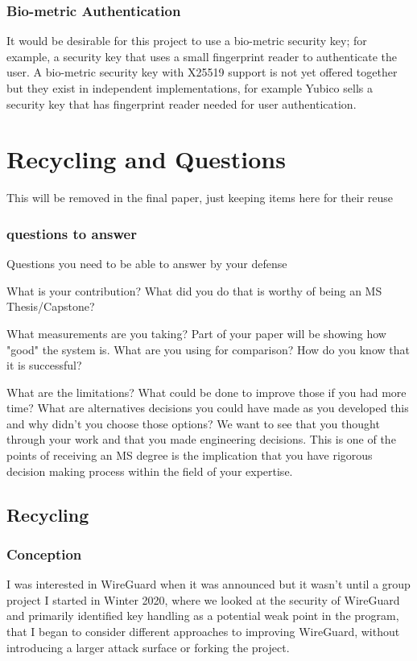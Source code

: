 \documentclass [11pt, proquest] {uwthesis}[2020/02/24]
\begin{document}
\subsection{Bio-metric Authentication}
It would be desirable for this project to use a bio-metric security key; for example, a security key that uses a small fingerprint reader to authenticate the user. A bio-metric security key with X25519 support is not yet offered together but they exist in independent implementations, for example Yubico sells a security key that has fingerprint reader needed for user authentication\cite{yubico_yubikey_2022}. 

\chapter{Recycling and Questions}
This will be removed in the final paper, just keeping items here for their reuse

\subsection{questions to answer}
Questions you need to be able to answer by your defense

    What is your contribution? What did you do that is worthy of being an MS Thesis/Capstone?

    What measurements are you taking? Part of your paper will be showing how "good" the system is. What are you using for comparison? How do you know that it is successful?

    What are the limitations? What could be done to improve those if you had more time? 
    What are alternatives decisions you could have made as you developed this and why didn't you choose those options? 
    We want to see that you thought through your work and that you made engineering decisions. 
        This is one of the points of receiving an MS degree is the implication that you have rigorous decision making process within the field of your expertise.
        
\section{Recycling}

\subsection {Conception}
I was interested in WireGuard when it was announced but it wasn't until a group project I started in Winter 2020, where we looked at the security of WireGuard and primarily identified key handling as a potential weak point in the program, that I began to consider different approaches to improving WireGuard,  without introducing a larger attack surface or forking the project. 
\end{document}
